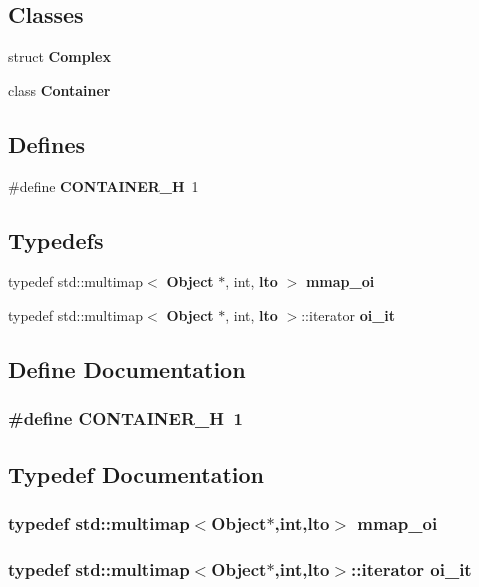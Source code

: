\subsection*{Classes}
\begin{CompactItemize}
\item 
struct {\bf Complex}
\item 
class {\bf Container}
\end{CompactItemize}
\subsection*{Defines}
\begin{CompactItemize}
\item 
\#define {\bf CONTAINER\_\-H}~1
\end{CompactItemize}
\subsection*{Typedefs}
\begin{CompactItemize}
\item 
typedef std::multimap$<$ {\bf Object} $\ast$, int, {\bf lto} $>$ {\bf mmap\_\-oi}
\item 
typedef std::multimap$<$ {\bf Object} $\ast$, int, {\bf lto} $>$::iterator {\bf oi\_\-it}
\end{CompactItemize}


\subsection{Define Documentation}
\subsubsection{\setlength{\rightskip}{0pt plus 5cm}\#define CONTAINER\_\-H~1}\label{container_8h_6c0e07fabcd28953ed38855dfb61763c}




\subsection{Typedef Documentation}
\subsubsection{\setlength{\rightskip}{0pt plus 5cm}typedef std::multimap$<${\bf Object}$\ast$,int,{\bf lto}$>$ {\bf mmap\_\-oi}}\label{container_8h_4504a18be36c8a2fa4bda1e190da7269}


\subsubsection{\setlength{\rightskip}{0pt plus 5cm}typedef std::multimap$<${\bf Object}$\ast$,int,{\bf lto}$>$::iterator {\bf oi\_\-it}}\label{container_8h_1f860f9dced750edcc3bd47bf4fe86cb}


